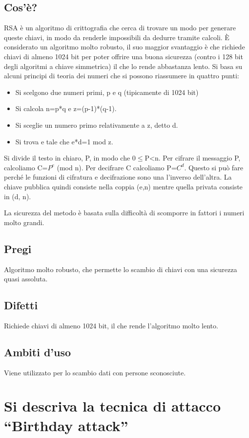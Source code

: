 \subsection{Cos'è?}
RSA è un algoritmo di crittografia che cerca di trovare un modo per generare queste chiavi, in modo da renderle impossibili da dedurre tramite calcoli.
È considerato un algoritmo molto robusto, il suo maggior svantaggio è che richiede chiavi di almeno 1024 bit per poter offrire una buona sicurezza (contro i 128 bit degli algoritmi a chiave simmetrica) il che lo rende abbastanza lento.
Si basa su alcuni principi di teoria dei numeri che si possono riassumere in quattro punti:
\begin{itemize}
\item	Si scelgono due numeri primi, p e q (tipicamente di 1024 bit)
\item	Si calcola n=p*q    e   z=(p-1)*(q-1).
\item	Si sceglie un numero primo relativamente a z, detto d.
\item	Si trova e tale che e*d=1 mod z.
\end{itemize}

Si divide il testo in chiaro, P, in modo che 0$\leq$P<n. Per cifrare il messaggio P, calcoliamo C=$P^e$ (mod n). Per decifrare C calcoliamo P=$C^d$. Questo si può fare perché le funzioni di cifratura e decifrazione sono una l’inverso dell’altra.
La chiave pubblica quindi consiste nella coppia (e,n) mentre quella privata consiste in (d, n).

La sicurezza del metodo è basata sulla difficoltà di scomporre in fattori i numeri molto grandi.

\subsection{Pregi}
Algoritmo molto robusto, che permette lo scambio di chiavi con una sicurezza quasi assoluta.
\subsection{Difetti}
Richiede chiavi di almeno 1024 bit, il che rende l'algoritmo molto lento.
\subsection{Ambiti d'uso}
Viene utilizzato per lo scambio dati con persone sconosciute.

\section{Si descriva la tecnica di attacco “Birthday attack”}
